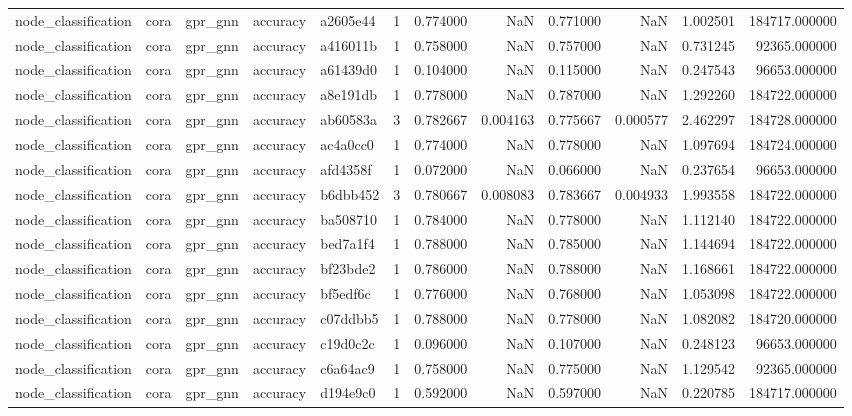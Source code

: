 \begin{tabular}{lllllrrrrrrr}
node_classification & cora & gpr_gnn & accuracy & a2605e44 & 1 & 0.774000 & NaN & 0.771000 & NaN & 1.002501 & 184717.000000 \\
node_classification & cora & gpr_gnn & accuracy & a416011b & 1 & 0.758000 & NaN & 0.757000 & NaN & 0.731245 & 92365.000000 \\
node_classification & cora & gpr_gnn & accuracy & a61439d0 & 1 & 0.104000 & NaN & 0.115000 & NaN & 0.247543 & 96653.000000 \\
node_classification & cora & gpr_gnn & accuracy & a8e191db & 1 & 0.778000 & NaN & 0.787000 & NaN & 1.292260 & 184722.000000 \\
node_classification & cora & gpr_gnn & accuracy & ab60583a & 3 & 0.782667 & 0.004163 & 0.775667 & 0.000577 & 2.462297 & 184728.000000 \\
node_classification & cora & gpr_gnn & accuracy & ac4a0cc0 & 1 & 0.774000 & NaN & 0.778000 & NaN & 1.097694 & 184724.000000 \\
node_classification & cora & gpr_gnn & accuracy & afd4358f & 1 & 0.072000 & NaN & 0.066000 & NaN & 0.237654 & 96653.000000 \\
node_classification & cora & gpr_gnn & accuracy & b6dbb452 & 3 & 0.780667 & 0.008083 & 0.783667 & 0.004933 & 1.993558 & 184722.000000 \\
node_classification & cora & gpr_gnn & accuracy & ba508710 & 1 & 0.784000 & NaN & 0.778000 & NaN & 1.112140 & 184722.000000 \\
node_classification & cora & gpr_gnn & accuracy & bed7a1f4 & 1 & 0.788000 & NaN & 0.785000 & NaN & 1.144694 & 184722.000000 \\
node_classification & cora & gpr_gnn & accuracy & bf23bde2 & 1 & 0.786000 & NaN & 0.788000 & NaN & 1.168661 & 184722.000000 \\
node_classification & cora & gpr_gnn & accuracy & bf5edf6c & 1 & 0.776000 & NaN & 0.768000 & NaN & 1.053098 & 184722.000000 \\
node_classification & cora & gpr_gnn & accuracy & c07ddbb5 & 1 & 0.788000 & NaN & 0.778000 & NaN & 1.082082 & 184720.000000 \\
node_classification & cora & gpr_gnn & accuracy & c19d0c2c & 1 & 0.096000 & NaN & 0.107000 & NaN & 0.248123 & 96653.000000 \\
node_classification & cora & gpr_gnn & accuracy & c6a64ac9 & 1 & 0.758000 & NaN & 0.775000 & NaN & 1.129542 & 92365.000000 \\
node_classification & cora & gpr_gnn & accuracy & d194e9c0 & 1 & 0.592000 & NaN & 0.597000 & NaN & 0.220785 & 184717.000000 \\

\end{tabular}
